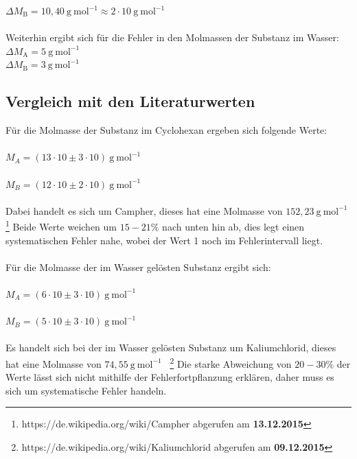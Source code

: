 \documentclass[12pt,a4paper,titlepage,headinclude,bibtotoc]{scrartcl}
\begin{document}
$\Delta M_\mathrm{B} = 10,40{~}\mathrm{g{~}mol^{-1}} \approx 2 \cdot 10 {~}\mathrm{g{~}mol^{-1}}$\\\\

Weiterhin ergibt sich für die Fehler in den Molmassen der Substanz im Wasser:\\
$\Delta M_\mathrm{A} = 5  {~}\mathrm{g{~}mol^{-1}} $\\
$\Delta M_\mathrm{B} = 3 {~}\mathrm{g{~}mol^{-1}}$\\

\subsection{Vergleich mit den Literaturwerten}
Für die Molmasse der Substanz im Cyclohexan ergeben sich folgende Werte:\\\\
$M_A = (13 \cdot 10 \pm 3 \cdot 10){~} \mathrm{g{~}mol^{-1}}$\\\\
$M_B = (12 \cdot 10 \pm 2 \cdot 10){~} \mathrm{g{~}mol^{-1}}$\\\\
Dabei handelt es sich um Campher, dieses hat eine Molmasse von $ 152,23{~} \mathrm{g{~}mol^{-1}}$ \footnote{https://de.wikipedia.org/wiki/Campher abgerufen am \textbf{13.12.2015}} Beide Werte weichen um $15-21\%$ nach unten hin ab, dies legt einen systematischen Fehler nahe, wobei der Wert 1 noch im Fehlerintervall liegt.\\\\
Für die Molmasse der im Wasser gelösten Substanz ergibt sich:\\\\
$M_A = (6 \cdot 10 \pm 3 \cdot 10){~} \mathrm{g{~}mol^{-1}}$\\\\
$M_B = (5\cdot 10 \pm 3\cdot 10 ){~} \mathrm{g{~}mol^{-1}}$\\\\
Es handelt sich bei der im Wasser gelösten Substanz um Kaliumchlorid, dieses hat eine Molmasse von $74,55{~} \mathrm{g{~}mol^{-1}}$ {~}\footnote{https://de.wikipedia.org/wiki/Kaliumchlorid abgerufen am \textbf{09.12.2015}} Die starke Abweichung von $20-30\%$ der Werte lässt sich nicht mithilfe der Fehlerfortpflanzung erklären, daher muss es sich um systematische Fehler handeln. 
\end{document}
